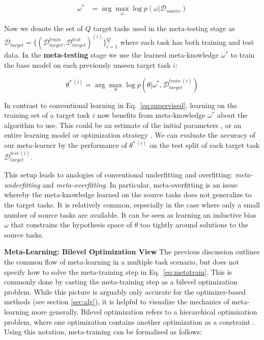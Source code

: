 \documentclass[10pt,journal,compsoc]{IEEEtran}
\newcommand{\cut}[1]{}
\newcommand{\keypoint}[1]{\vspace{0.1cm}\noindent\textbf{#1}\quad}
\begin{document}
\begin{align}
\label{eq:metatrain}
 \omega^* &=\arg\max_\omega\log p(\omega|\mathscr{D}_{source})
\end{align}

Now we denote the set of $Q$ target tasks used in the meta-testing stage as $\mathscr{D}_{target}=\{(\mathcal{D}^{train}_{target}, \mathcal{D}^{test}_{target})^{(i)}\}_{i=1}^Q$ where each task has both training and test data. In the \textbf{meta-testing} stage\cut{\footnote{While we use meta-train and meta-test to refer to the phases outlined above, we note that some papers overload these terms to refer to the inner and outer optimizations respectively within meta-training as used above.}} we use the learned meta-knowledge $\omega^*$ to train the base model on each previously unseen target task $i$:

\begin{equation}\label{eq:metatest}
 \theta^{*~(i)} = \arg\max_\theta\log p(\theta|\omega^*,\mathcal{D}^{train~(i)}_{target})
\end{equation}

In contrast to conventional learning in Eq.~\ref{eq:supervised}, learning on the training set of a target task $i$ now benefits from meta-knowledge $\omega^*$ about the algorithm to use. This could be an estimate of the initial parameters \cite{finn2017maml}, or an entire learning model \cite{mishra2017simple} or optimization strategy \cite{ravi2016optimization}. We can evaluate the accuracy of our meta-learner by the performance of $\theta^{*~(i)}$ on the test split of each target task $\mathcal{D}^{test~(i)}_{target}$.



This setup leads to analogies of conventional underfitting and overfitting: \emph{meta-underfitting} and \emph{meta-overfitting}. In particular, meta-overfitting is an issue whereby the meta-knowledge learned on the source tasks does not generalize to the target tasks. It is relatively common, especially in the case where only a small number of source tasks are available. It can be seen as learning an inductive bias $\omega$ that constrains the hypothesis space of $\theta$ too tightly around solutions to the source tasks.


\keypoint{Meta-Learning: Bilevel Optimization View} The previous discussion outlines the common flow of meta-learning in a multiple task scenario, but does not specify how to solve the meta-training step in Eq.~\ref{eq:metatrain}. This is commonly done by casting the meta-training step as a bilevel optimization problem. While this picture is arguably only accurate for the optimizer-based methods (see section \ref{sec:alg}), it is helpful to visualize the mechanics of meta-learning more generally. Bilevel optimization \cite{stackelberg1952bileveloptimization} refers to a hierarchical optimization problem, where one optimization contains another optimization as a constraint \cite{franceschi2018bilevel,sinha2018bilevelsurvey}. Using this notation, meta-training can be formalised as follows:
\end{document}
